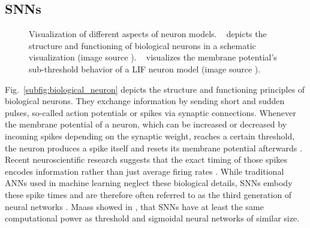 \subsection{\aclp{SNN}}
\label{subsec:SNN}
\begin{figure}[t!]
	\centering
    \caption{Visualization of different aspects of neuron models. ~\protect{} depicts the structure and functioning of biological neurons in a schematic visualization (image source \cite{Gerstner2002}). ~\protect{} visualizes the membrane potential's sub-threshold behavior of a \ac{LIF} neuron model (image source \cite{Masquelier2007}).}\label{fig:neuron_models}
\end{figure}

Fig.~\ref{subfig:biological_neuron} depicts the structure and functioning principles of biological neurons.
They  exchange information by sending short and sudden pulses, so-called action potentials or spikes via synaptic connections.
Whenever the membrane potential of a neuron, which can be increased or decreased by incoming spikes depending on the synaptic weight, reaches a certain threshold, the neuron produces a spike itself and resets its membrane potential afterwards \cite{Gerstner2002, Paugam2009}.
Recent neuroscientific research suggests that the exact timing of those spikes encodes information rather than just average firing rates \cite{Bohte2004}.
While traditional \acp{ANN} used in machine learning neglect these biological details, \acp{SNN} embody these spike times and are therefore often referred to as the third generation of neural networks \cite{Maass1997, Paugam2009}.
Maass showed in \cite{Maass1997}, that \acp{SNN} have at least the same computational power as threshold and sigmoidal neural networks of similar size.

